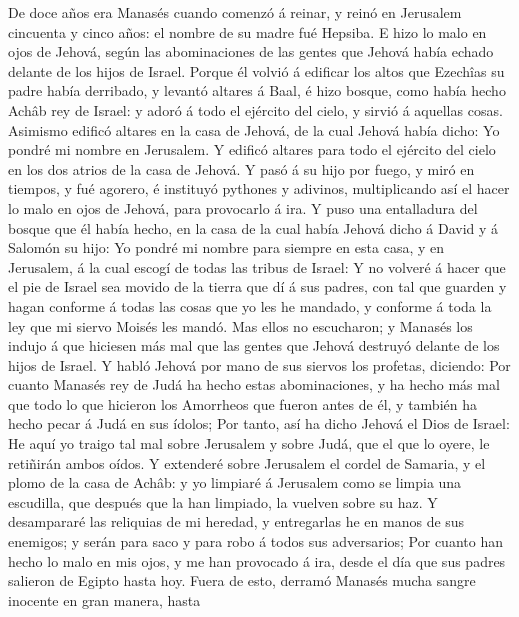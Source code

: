  De doce años era Manasés cuando comenzó á reinar, y reinó
en Jerusalem cincuenta y cinco años: el nombre de su madre fué Hepsiba.
 E hizo lo malo en ojos de Jehová, según las abominaciones
de las gentes que Jehová había echado delante de los hijos de Israel.
 Porque él volvió á edificar los altos que Ezechîas su padre
había derribado, y levantó altares á Baal, é hizo bosque, como había
hecho Achâb rey de Israel: y adoró á todo el ejército del cielo, y
sirvió á aquellas cosas.  Asimismo edificó altares en la
casa de Jehová, de la cual Jehová había dicho: Yo pondré mi nombre en
Jerusalem.  Y edificó altares para todo el ejército del
cielo en los dos atrios de la casa de Jehová.  Y pasó á su
hijo por fuego, y miró en tiempos, y fué agorero, é instituyó pythones y
adivinos, multiplicando así el hacer lo malo en ojos de Jehová, para
provocarlo á ira.  Y puso una entalladura del bosque que él
había hecho, en la casa de la cual había Jehová dicho á David y á
Salomón su hijo: Yo pondré mi nombre para siempre en esta casa, y en
Jerusalem, á la cual escogí de todas las tribus de Israel: 
Y no volveré á hacer que el pie de Israel sea movido de la tierra que dí
á sus padres, con tal que guarden y hagan conforme á todas las cosas que
yo les he mandado, y conforme á toda la ley que mi siervo Moisés les
mandó.  Mas ellos no escucharon; y Manasés los indujo á que
hiciesen más mal que las gentes que Jehová destruyó delante de los hijos
de Israel.  Y habló Jehová por mano de sus siervos los
profetas, diciendo:  Por cuanto Manasés rey de Judá ha
hecho estas abominaciones, y ha hecho más mal que todo lo que hicieron
los Amorrheos que fueron antes de él, y también ha hecho pecar á Judá en
sus ídolos;  Por tanto, así ha dicho Jehová el Dios de
Israel: He aquí yo traigo tal mal sobre Jerusalem y sobre Judá, que el
que lo oyere, le retiñirán ambos oídos.  Y extenderé sobre
Jerusalem el cordel de Samaria, y el plomo de la casa de Achâb: y yo
limpiaré á Jerusalem como se limpia una escudilla, que después que la
han limpiado, la vuelven sobre su haz.  Y desampararé las
reliquias de mi heredad, y entregarlas he en manos de sus enemigos; y
serán para saco y para robo á todos sus adversarios;  Por
cuanto han hecho lo malo en mis ojos, y me han provocado á ira, desde el
día que sus padres salieron de Egipto hasta hoy.  Fuera de
esto, derramó Manasés mucha sangre inocente en gran manera, hasta
